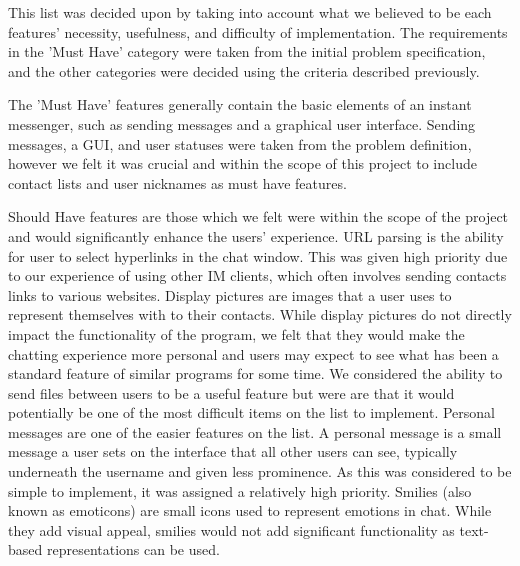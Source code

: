 This list was decided upon by taking into account what we believed to be each features' necessity, usefulness, and difficulty of implementation. The requirements in the 'Must Have' category were taken from the initial problem specification, and the other categories were decided using the criteria described previously.

The 'Must Have' features generally contain the basic elements of an instant messenger, such as sending messages and a graphical user interface. Sending messages, a GUI, and user statuses were taken from the problem definition, however we felt it was crucial and within the scope of this project to include contact lists and user nicknames as must have features.

Should Have features are those which we felt were within the scope of the project and would significantly enhance the users' experience. URL parsing is the ability for user to select hyperlinks in the chat window. This was given high priority due to our experience of using other IM clients, which often involves sending contacts links to various websites. Display pictures are images that a user uses to represent themselves with to their contacts. While display pictures do not directly impact the functionality of the program, we felt that they would make the chatting experience more personal and users may expect to see what has been a standard feature of similar programs for some time. We considered the ability to send files between users to be a useful feature but were are that it would potentially be one of the most difficult items on the list to implement. Personal messages are one of the easier features on the list. A personal message is a small message a user sets on the interface that all other users can see, typically underneath the username and given less prominence. As this was considered to be simple to implement, it was assigned a relatively high priority. Smilies (also known as emoticons) are small icons used to represent emotions in chat. While they add visual appeal, smilies would not add significant functionality as text-based representations can be used.

